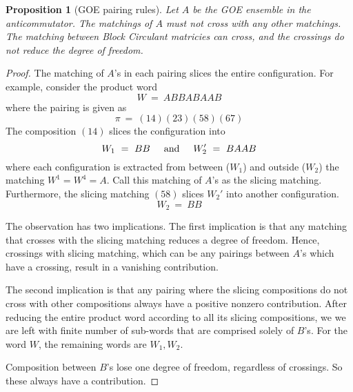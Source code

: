\documentclass[12pt,reqno]{amsart}
\theoremstyle{plain} %
\newtheorem{prop}[theorem]{Proposition}
\theoremstyle{remark}
\theoremstyle{definition}
\begin{document}
\begin{prop} [GOE pairing rules]
    Let $A$ be the GOE ensemble in the anticommutator. 
    The matchings of $A$ must not cross with any other 
    matchings. The matching between Block 
    Circulant matricies can cross, and the crossings 
    do not reduce the degree of freedom. 
\end{prop}
\begin{proof}
    The matching of $A$'s in each pairing slices 
    the entire configuration. For example, consider the product word 
    \[
        W \ = \ ABBABAAB
    \]
    where the pairing is given as 
    \[
        \pi \ = \ (1 4)(2 3)(5 8) (6 7)
    \]
    The composition $(14)$ slices the configuration into 
    \[
        W_1 \ = \ BB 
        { \hspace{5mm} \textrm{and} \hspace{5mm} } 
        W_2' \ = \ BAAB 
    \]
    where each configuration is extracted from between ($W_1$) and 
    outside ($W_2$) the matching $W^1 = W^4 = A$. Call 
    this matching of $A$'s as the slicing matching.
    Furthermore, the slicing matching $(58)$ slices $W_2'$ 
    into another configuration. 
    \[
        W_2 \ = \ BB
    \]

    The observation has two implications. The first implication 
    is that any matching that crosses with the slicing 
    matching reduces a degree of freedom. Hence, crossings 
    with slicing matching, which can be any pairings between $A$'s which have a 
    crossing, 
    result in a vanishing contribution. 

    The second implication is that any pairing where the 
    slicing compositions do not cross with other compositions 
    always have a positive nonzero contribution. After reducing the entire 
    product word according to all its slicing compositions, we 
    we are left with finite number of sub-words that are comprised solely 
    of $B$'s. For the word $W$, the remaining words are $W_1, W_2$. 

    Composition between $B$'s lose one degree of freedom, regardless of 
    crossings. So these always have a contribution.
\end{proof}
\end{document}
